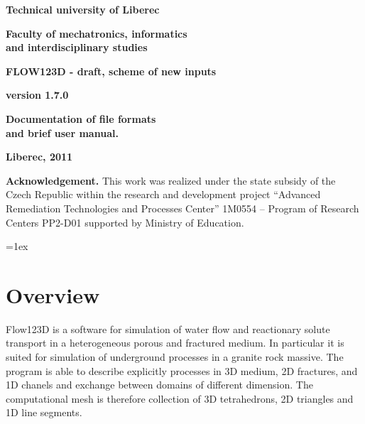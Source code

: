 \documentclass[12pt,a4paper]{report}
\begin{document}
\thispagestyle{empty}
\begin{center}
\noindent 
\textbf{\LARGE{
  Technical university of Liberec
}}

\vspace{2ex}
\textbf{\LARGE{
  Faculty of mechatronics, informatics\\
  and interdisciplinary studies
}}

\vspace{160pt}

\textbf{\Huge{
FLOW123D - draft, scheme of new inputs
}}

\vspace{1cm}
\textbf{\Large{
version 1.7.0
}}

\vspace{1cm}

\textbf{\Large{
Documentation of file formats \\
and brief user manual.
}}


\vspace{7cm}

\noindent \textbf{\Large{Liberec, 2011}}

\vspace{1cm}

{\bf Acknowledgement.} This work was realized under the state  subsidy of the Czech Republic within the research and development 
project ``Advanced Remediation Technologies and Processes Center'' 1M0554 
-- Program of Research Centers PP2-D01 supported by Ministry of Education.
\end{center}
\noindent 

\noindent

\tableofcontents
\pagebreak

\parindent=0pt
\parskip=1ex

\chapter{Overview}

Flow123D is a software for simulation of water flow and reactionary solute transport in a heterogeneous 
porous and fractured medium. In particular it is suited for simulation of underground processes in a granite rock massive.
The program is able to describe explicitly processes in 3D medium, 2D fractures, and 1D chanels and exchange between 
domains of different dimension. The computational mesh is therefore collection of 3D tetrahedrons, 2D triangles and 1D line segments.
\end{document}
